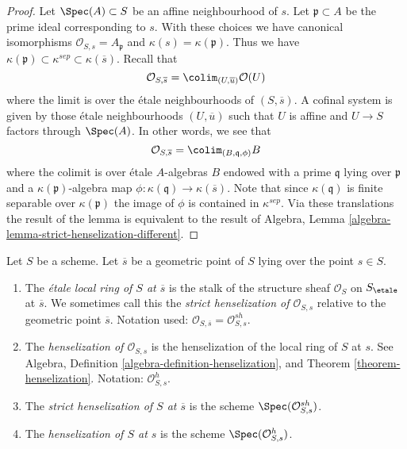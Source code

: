 \begin{proof}
Let $\Spec(A) \subset S$ be an affine neighbourhood of $s$.
Let $\mathfrak p \subset A$ be the prime ideal corresponding to $s$.
With these choices we have canonical isomorphisms
$\mathcal{O}_{S, s} = A_{\mathfrak p}$ and $\kappa(s) = \kappa(\mathfrak p)$.
Thus we have
$\kappa(\mathfrak p) \subset \kappa^{sep} \subset \kappa(\overline{s})$.
Recall that
$$
\mathcal{O}_{S, \overline{s}} =
\colim_{(U, \overline{u})} \mathcal{O}(U)
$$
where the limit is over the \'etale neighbourhoods of $(S, \overline{s})$.
A cofinal system is given by those \'etale neighbourhoods $(U, \overline{u})$
such that $U$ is affine and $U \to S$ factors through $\Spec(A)$.
In other words, we see that
$$
\mathcal{O}_{S, \overline{s}} = \colim_{(B, \mathfrak q, \phi)} B
$$
where the colimit is over \'etale $A$-algebras $B$ endowed with a prime
$\mathfrak q$ lying over $\mathfrak p$ and a
$\kappa(\mathfrak p)$-algebra map
$\phi : \kappa(\mathfrak q) \to \kappa(\overline{s})$.
Note that since $\kappa(\mathfrak q)$ is finite separable over
$\kappa(\mathfrak p)$ the image of $\phi$ is contained in $\kappa^{sep}$.
Via these translations the result of the lemma is equivalent
to the result of
Algebra, Lemma \ref{algebra-lemma-strict-henselization-different}.
\end{proof}

\begin{definition}
\label{definition-etale-local-rings}
Let $S$ be a scheme. Let $\overline{s}$ be a geometric point of $S$
lying over the point $s \in S$.
\begin{enumerate}
\item The {\it \'etale local ring of $S$ at $\overline{s}$}
is the stalk of the structure sheaf $\mathcal{O}_S$ on $S_\etale$
at $\overline{s}$. We sometimes call this the
{\it strict henselization of $\mathcal{O}_{S, s}$} relative
to the geometric point $\overline{s}$.
Notation used:
$\mathcal{O}_{S, \overline{s}} = \mathcal{O}_{S, s}^{sh}$.
\item The {\it henselization of $\mathcal{O}_{S, s}$} is the
henselization of the local ring of $S$ at $s$. See
Algebra, Definition \ref{algebra-definition-henselization},
and
Theorem \ref{theorem-henselization}.
Notation: $\mathcal{O}_{S, s}^h$.
\item The {\it strict henselization of $S$ at $\overline{s}$}
is the scheme $\Spec(\mathcal{O}_{S, s}^{sh})$.
\item The {\it henselization of $S$ at $s$} is the scheme
$\Spec(\mathcal{O}_{S, s}^h)$.
\end{enumerate}
\end{definition}

